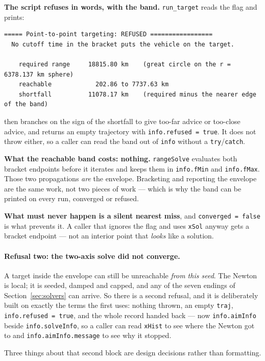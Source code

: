 \documentclass[11pt]{article}
\newcommand{\code}[1]{\texttt{#1}}
\begin{document}
\textbf{The script refuses in words, with the band.} \code{run\_target} reads
the flag and prints:

\begin{lstlisting}
===== Point-to-point targeting: REFUSED =================
  No cutoff time in the bracket puts the vehicle on the target.

    required range     18815.80 km    (great circle on the r = 6378.137 km sphere)
    reachable            202.86 to 7737.63 km
    shortfall          11078.17 km    (required minus the nearer edge of the band)
\end{lstlisting}

then branches on the sign of the shortfall to give too-far advice or too-close
advice, and returns an empty trajectory with \code{info.refused = true}. It
does not throw either, so a caller can read the band out of \code{info} without
a \code{try}/\code{catch}.

\textbf{What the reachable band costs: nothing.} \code{rangeSolve} evaluates
both bracket endpoints before it iterates and keeps them in \code{info.fMin}
and \code{info.fMax}. Those two propagations \emph{are} the envelope. Bracketing
and reporting the envelope are the same work, not two pieces of work --- which
is why the band can be printed on every run, converged or refused.

\textbf{What must never happen is a silent nearest miss}, and
\code{converged = false} is what prevents it. A caller that ignores the flag
and uses \code{xSol} anyway gets a bracket endpoint --- not an interior point
that \emph{looks} like a solution.

\paragraph{Refusal two: the two-axis solve did not converge.}

A target inside the envelope can still be unreachable \emph{from this seed}.
The Newton is local; it is seeded, damped and capped, and any of the seven
endings of Section~\ref{sec:solvers} can arrive. So there is a second refusal,
and it is deliberately built on exactly the terms the first uses: nothing
thrown, an empty \code{traj}, \code{info.refused = true}, and the whole record
handed back --- now \code{info.aimInfo} beside \code{info.solveInfo}, so a
caller can read \code{xHist} to see where the Newton got to and
\code{info.aimInfo.message} to see why it stopped.

Three things about that second block are design decisions rather than
formatting.
\end{document}
